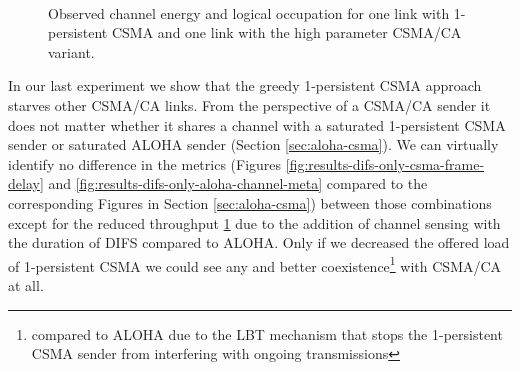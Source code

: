 \begin{figure}[tb]
	\label{fig:results-difs-only-csma-channel-meta}
	\begin{center}
		\\
	\end{center}
	\caption{Observed channel energy and logical occupation for one link with 1-persistent CSMA and one link with the high parameter CSMA/CA variant.}
\end{figure}

In our last experiment we show that the greedy 1-persistent CSMA approach starves other CSMA/CA links. From the perspective of a CSMA/CA sender it does not matter whether it shares a channel with a saturated 1-persistent CSMA sender or saturated ALOHA sender (Section \ref{sec:aloha-csma}). We can virtually identify no difference in the metrics (Figures \ref{fig:results-difs-only-csma-frame-delay} and \ref{fig:results-difs-only-aloha-channel-meta} compared to the corresponding Figures in Section \ref{sec:aloha-csma}) between those combinations except for the reduced throughput \ref{fig:results-difs-only-csma-channel-meta} due to the addition of channel sensing with the duration of DIFS compared to ALOHA. Only if we decreased the offered load of 1-persistent CSMA we could see any and better coexistence\footnote{compared to ALOHA due to the LBT mechanism that stops the 1-persistent CSMA sender from interfering with ongoing transmissions} with CSMA/CA at all.

